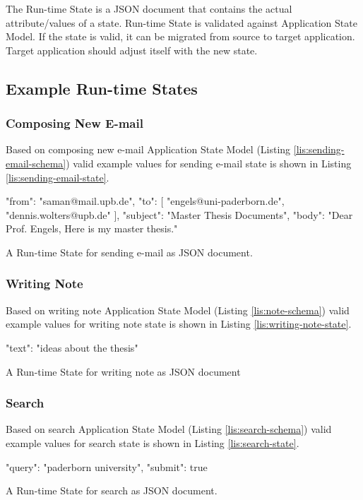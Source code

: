 The Run-time State is a JSON document that contains the actual attribute/values of a state. Run-time State is validated against Application State Model. If the state is valid, it can be migrated from source to target application.
Target application should adjust itself with the new state.

\subsection{Example Run-time States}

\subsubsection{Composing New E-mail}
Based on composing new e-mail Application State Model (Listing \ref{lis:sending-email-schema}) valid example values for sending e-mail state is shown in Listing \ref{lis:sending-email-state}.


\FloatBarrier
\begin{code}
\begin{json}
{
  "from": "saman@mail.upb.de",
  "to": [
    "engels@uni-paderborn.de",
    "dennis.wolters@upb.de"
  ],
  "subject": "Master Thesis Documents",
  "body": "Dear Prof. Engels\n, Here is my master thesis."
}
\end{json}
\caption{A Run-time State for sending e-mail as JSON document.}
\label{lis:sending-email-state}
\end{code}
\FloatBarrier

\subsubsection{Writing Note}
Based on writing note Application State Model (Listing \ref{lis:note-schema}) valid example values for writing note state is shown in Listing \ref{lis:writing-note-state}.
 
\FloatBarrier
\begin{code}
\begin{json}
{
    "text": "ideas about the thesis"
}
\end{json}
\caption{A Run-time State for writing note as JSON document}
\label{lis:writing-note-state}
\end{code}
\FloatBarrier


\subsubsection{Search}
Based on search Application State Model (Listing \ref{lis:search-schema}) valid example values for search state is shown in Listing \ref{lis:search-state}.

\FloatBarrier
\begin{code}
\begin{json}
{
    "query": "paderborn university",
    "submit": true
}
\end{json}
\caption{A Run-time State for search as JSON document.}
\label{lis:search-state}
\end{code}
\FloatBarrier
